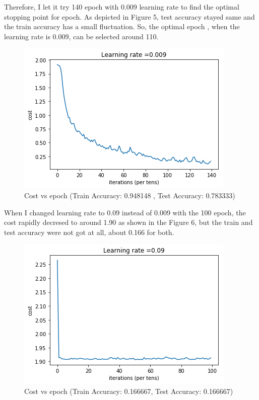 \documentclass{article}
\begin{document}
Therefore, I let it try 140 epoch with 0.009 learning rate to find the optimal  stopping point for epoch. As depicted in Figure 5, test accuracy stayed same and the train accuracy has a small fluctuation. So, the optimal epoch , when the learning rate is 0.009, can be selected around 110.
\begin{figure}[h!]
	\centering
	\includegraphics[scale=0.55]{result009ep140.png}
	\caption{Cost vs epoch (Train Accuracy: 0.948148 ,  Test Accuracy: 0.783333)}
	\label{fig:univerise}
\end{figure}

When I changed learning rate to 0.09 instead of 0.009 with the 100 epoch, the cost rapidly decresed to around 1.90 as shown in the Figure 6, but the train and test accuracy were not got at all, about 0.166 for both.

\begin{figure}[h!]
	\centering
	\includegraphics[scale=0.55]{result09ep100.png}
	\caption{Cost vs epoch (Train Accuracy: 0.166667,  Test Accuracy: 0.166667)}
	\label{fig:univerise}
\end{figure}

\newpage
\end{document}
